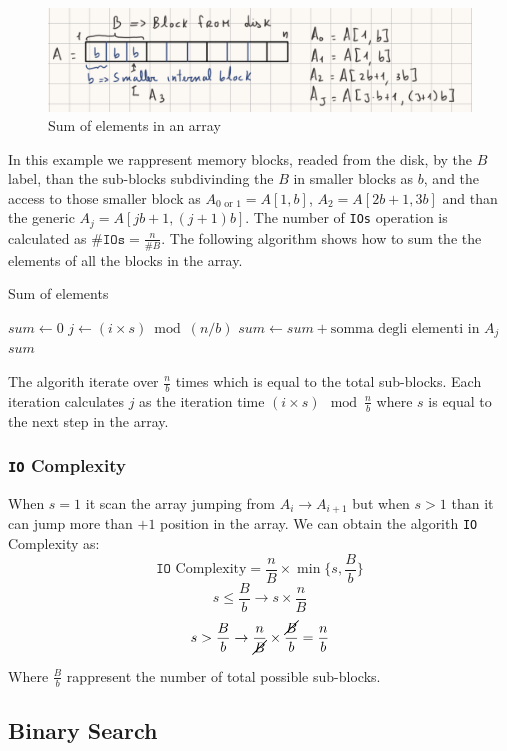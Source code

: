 \begin{figure}[h!]
  \centering
  \includegraphics[width=1\textwidth]{images/sum_of_elements.png}
  \caption{Sum of elements in an array}
  \label{fig:sum_of_elements_array}
\end{figure}

In this example we rappresent memory blocks, readed from the disk, by
the $B$ label, than the sub-blocks subdivinding the $B$ in smaller
blocks as $b$, and the access to those smaller block as $A_{0 \text{ or }
1} = A[1,b]$, $A_{2} = A[2b + 1,3b]$ and than the generic $A_{j} =
A[jb + 1, (j + 1)b]$.
The number of \texttt{IOs} operation is calculated as $\#\texttt{IOs}
= \frac{n}{\#B}$.
The following algorithm shows how to sum the the elements of all the
blocks in the array.

\begin{algorithm}
  \caption{Sum of elements}
  \label{algo:sum_of_elements_array}
  \begin{algorithmic}[1] %
    \State $sum \gets 0$
    \State $j \gets (i \times s) \bmod (n/b)$
    \State $sum \gets sum + \text{somma degli elementi in } A_j$
    \EndFor
    \State \Return $sum$
    \EndProcedure{}
  \end{algorithmic}
\end{algorithm}

The algorith iterate over $\frac{n}{b}$ times which is equal to the
total sub-blocks.
Each iteration calculates $j$ as the iteration time $(i \times s)
\mod \frac{n}{b}$ where $s$ is equal to the next step in the array.

\subsubsection{\texttt{IO} Complexity}
When $s = 1$ it scan the array jumping from $A_i \rightarrow A_{i +
1}$ but when $s > 1$ than it can jump more than
$+1$ position in the array.
We can obtain the algorith \texttt{IO} Complexity as:
$$\texttt{IO }\text{Complexity} = \frac{n}{B} \times \min\{s, \frac{B}{b}\}$$
$$s \le \frac{B}{b} \rightarrow s \times \frac{n}{B}$$
$$s > \frac{B}{b} \rightarrow \frac{n}{\cancel{B}} \times
\frac{\cancel{B}}{b} = \frac{n}{b}$$

\noindent Where $\frac{B}{b}$ rappresent the number of total possible
sub-blocks.

\subsection{Binary Search}
